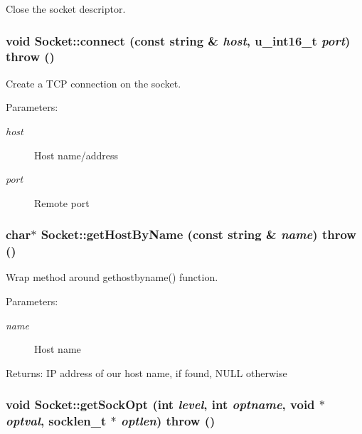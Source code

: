 Close the socket descriptor. 

\hypertarget{classSocket_b5a8796547ecffdbb048fd295bb8390d}{
\subsubsection[{connect}]{\setlength{\rightskip}{0pt plus 5cm}void Socket::connect (const string \& {\em host}, \/  u\_\-int16\_\-t {\em port})  throw ()}}
\label{classSocket_b5a8796547ecffdbb048fd295bb8390d}


Create a TCP connection on the socket. 

\begin{Desc}
\item[Parameters:]
\begin{description}
\item[{\em host}]Host name/address \item[{\em port}]Remote port \end{description}
\end{Desc}
\hypertarget{classSocket_c065c8091357f3d3b11d63f43bea734a}{
\subsubsection[{getHostByName}]{\setlength{\rightskip}{0pt plus 5cm}char$\ast$ Socket::getHostByName (const string \& {\em name})  throw ()}}
\label{classSocket_c065c8091357f3d3b11d63f43bea734a}


Wrap method around gethostbyname() function. 

\begin{Desc}
\item[Parameters:]
\begin{description}
\item[{\em name}]Host name \end{description}
\end{Desc}
\begin{Desc}
\item[Returns:]IP address of our host name, if found, NULL otherwise \end{Desc}
\hypertarget{classSocket_25b831123a5914c6203c72cb8a48026b}{
\subsubsection[{getSockOpt}]{\setlength{\rightskip}{0pt plus 5cm}void Socket::getSockOpt (int {\em level}, \/  int {\em optname}, \/  void $\ast$ {\em optval}, \/  socklen\_\-t $\ast$ {\em optlen})  throw ()}}
\label{classSocket_25b831123a5914c6203c72cb8a48026b}


